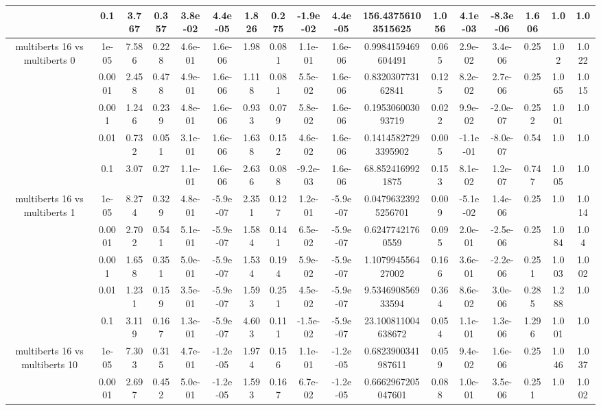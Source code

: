\begin{tabular}{|c|c|c|c|c|c|c|c|c|c|c|c|c|c|c|c|c|}
 & 0.1 & 3.767 & 0.357 & 3.8e-02 & 4.4e-05 & 1.826 & 0.275 & -1.9e-02 & 4.4e-05 & 156.43756103515625 & 1.056 & 4.1e-03 & -8.3e-06 & 1.606 & 1.0 & 1.0 \\
\hline
\multirow{5}{*}{multiberts 16 vs multiberts 0} & 1e-05 & 7.586 & 0.228 & 4.6e-01 & 1.6e-06 & 1.98 & 0.081 & 1.1e-01 & 1.6e-06 & 0.9984159469604491 & 0.065 & 2.9e-02 & 3.4e-06 & 0.25 & 1.02 & 1.022 \\
 & 0.0001 & 2.458 & 0.478 & 4.9e-01 & 1.6e-06 & 1.118 & 0.081 & 5.5e-02 & 1.6e-06 & 0.832030773162841 & 0.125 & 8.2e-02 & 2.7e-06 & 0.25 & 1.065 & 1.015 \\
 & 0.001 & 1.246 & 0.239 & 4.8e-01 & 1.6e-06 & 0.933 & 0.079 & 5.8e-02 & 1.6e-06 & 0.195306003093719 & 0.022 & 9.9e-02 & -2.0e-07 & 0.252 & 1.001 & 1.0 \\
 & 0.01 & 0.732 & 0.051 & 3.1e-01 & 1.6e-06 & 1.638 & 0.152 & 4.6e-02 & 1.6e-06 & 0.14145827293395902 & 0.005 & -1.1e-01 & -8.0e-07 & 0.54 & 1.0 & 1.0 \\
 & 0.1 & 3.07 & 0.27 & 1.1e-01 & 1.6e-06 & 2.636 & 0.088 & -9.2e-03 & 1.6e-06 & 68.8524169921875 & 0.153 & 8.1e-02 & 1.2e-07 & 0.747 & 1.005 & 1.0 \\
\hline
\multirow{5}{*}{multiberts 16 vs multiberts 1} & 1e-05 & 8.274 & 0.329 & 4.8e-01 & -5.9e-07 & 2.351 & 0.127 & 1.2e-01 & -5.9e-07 & 0.04796323925256701 & 0.009 & -5.1e-02 & 1.4e-06 & 0.25 & 1.0 & 1.014 \\
 & 0.0001 & 2.702 & 0.541 & 5.1e-01 & -5.9e-07 & 1.584 & 0.141 & 6.5e-02 & -5.9e-07 & 0.62477421760559 & 0.095 & 2.0e-01 & -2.5e-06 & 0.25 & 1.084 & 1.04 \\
 & 0.001 & 1.658 & 0.351 & 5.0e-01 & -5.9e-07 & 1.534 & 0.194 & 5.9e-02 & -5.9e-07 & 1.107994556427002 & 0.166 & 3.6e-01 & -2.2e-06 & 0.251 & 1.003 & 1.002 \\
 & 0.01 & 1.231 & 0.159 & 3.5e-01 & -5.9e-07 & 1.593 & 0.251 & 4.5e-02 & -5.9e-07 & 9.534690856933594 & 0.364 & 8.6e-02 & 3.0e-06 & 0.285 & 1.288 & 1.0 \\
 & 0.1 & 3.119 & 0.167 & 1.3e-01 & -5.9e-07 & 4.603 & 0.111 & -1.5e-02 & -5.9e-07 & 23.100811004638672 & 0.054 & 1.1e-01 & 1.3e-06 & 1.296 & 1.001 & 1.0 \\
\hline
\multirow{5}{*}{multiberts 16 vs multiberts 10} & 1e-05 & 7.303 & 0.315 & 4.7e-01 & -1.2e-05 & 1.974 & 0.156 & 1.1e-01 & -1.2e-05 & 0.6823900341987611 & 0.059 & 9.4e-02 & 1.6e-06 & 0.25 & 1.046 & 1.037 \\
 & 0.0001 & 2.697 & 0.452 & 5.0e-01 & -1.2e-05 & 1.593 & 0.167 & 6.7e-02 & -1.2e-05 & 0.6662967205047601 & 0.088 & 1.0e-01 & 3.5e-06 & 0.251 & 1.0 & 1.002 \\

\end{tabular}
